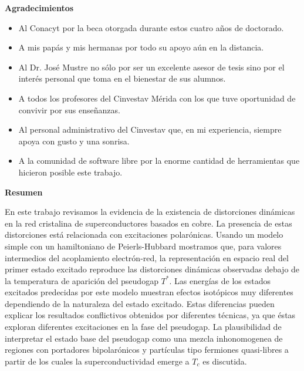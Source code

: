 
\cleardoublepage
{}
{}

\begin{center}
\textbf{\large Agradecimientos}
\end{center}
\vspace{3cm}

\begin{itemize}
    \item Al Conacyt por la beca otorgada durante estos cuatro años de doctorado.
    \item A mis pap\'{a}s y mis hermanas por todo su apoyo a\'{u}n en la distancia.
    \item Al Dr. Jos\'{e} Mustre no s\'{o}lo por ser un excelente asesor de tesis sino por el inter\'{e}s personal que toma en el bienestar de sus alumnos.
    \item A todos los profesores del Cinvestav M\'{e}rida con los que tuve oportunidad de convivir por sus enseñanzas.
    \item Al personal administrativo del Cinvestav que, en mi experiencia, siempre apoya con gusto y una sonrisa.
    \item A la comunidad de software libre por la enorme cantidad de herramientas que hicieron posible este trabajo.
\end{itemize}


\cleardoublepage
{}
{}
\begin{center}
\textbf{\large Resumen}
\end{center}
En este trabajo revisamos la evidencia de la existencia de distorciones din\'{a}micas en la red cristalina de superconductores basados en cobre. 
La presencia de estas distorciones est\'{a} relacionada con excitaciones polar\'{o}nicas. 
Usando un modelo simple con un hamiltoniano de Peierls-Hubbard mostramos que, para valores intermedios del acoplamiento electr\'{o}n-red, la representaci\'{o}n en espacio real del primer estado excitado reproduce las distorciones din\'{a}micas observadas debajo de la temperatura de aparici\'{o}n del pseudogap $T^*$. 
Las energ\'{i}as de los estados excitados predecidas por este modelo muestran efectos isot\'{o}picos muy diferentes dependiendo de la naturaleza del estado excitado. 
Estas diferencias pueden explicar los resultados conflictivos obtenidos por diferentes t\'{e}cnicas, ya que \'{e}stas exploran diferentes excitaciones en la fase del pseudogap. 
La plausibilidad de interpretar el estado base del pseudogap como una mezcla inhonomogenea de regiones con portadores bipolar\'{o}nicos y part\'{i}culas tipo fermiones quasi-libres a partir de los cuales la superconductividad emerge a $T_c$ es discutida.

